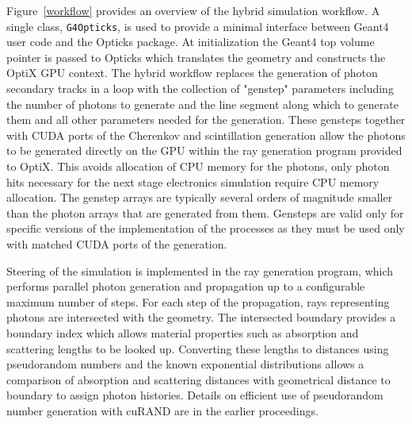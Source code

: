 \documentclass{webofc}
\begin{document}
Figure~\ref{workflow} provides an overview of the hybrid simulation workflow. 
A single class, {\tt G4Opticks}, is used to provide a 
minimal interface between Geant4 user code and 
the Opticks package. 
At initialization the Geant4 top volume pointer is
passed to Opticks which translates the geometry and constructs 
the OptiX GPU context.
%
The hybrid workflow replaces the generation of photon secondary tracks in a loop
with the collection of "genstep" parameters including the number of photons to generate
and the line segment along which to generate them and all other parameters needed for the generation.
These gensteps together with CUDA ports of the Cherenkov and scintillation generation  
allow the photons to be generated directly on the GPU within the ray generation program 
provided to OptiX.
%
This avoids allocation of CPU memory for the photons, only photon hits necessary for 
the next stage electronics simulation require CPU memory allocation.  
%
The genstep arrays are typically several orders of magnitude smaller than the photon arrays 
that are generated from them.  Gensteps are valid only for specific versions of the implementation
of the processes as they must be used only with matched CUDA ports of the generation.  

Steering of the simulation is implemented in the ray generation program, 
which performs parallel photon generation and propagation up to a configurable maximum 
number of steps. For each step of the propagation, rays representing photons are intersected
with the geometry. The intersected boundary provides a boundary index which allows 
material properties such as absorption and scattering lengths to be looked up. 
Converting these lengths to distances using pseudorandom numbers and 
the known exponential distributions allows a comparison of absorption and scattering distances 
with geometrical distance to boundary to assign photon histories. 
Details on efficient use of pseudorandom number generation with cuRAND\cite{curandURL} are in the 
earlier proceedings\cite{chep2016}.
%
%
%
%
\end{document}
